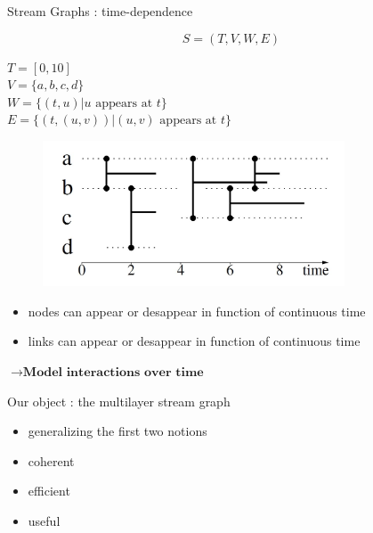 \documentclass[15pt]{beamer}
\begin{document}
\begin{frame}{Stream Graphs : time-dependence}

\[
	S=(T,V,W,E)
\]
\medskip

\begin{minipage}{0.43\textwidth}
\begin{footnotesize}
$T=[0,10]$\\
$V=\{a,b,c,d\}$\\
$W = \{(t,u) | u \text{ appears at } t\}$\\
$E = \{(t,(u,v)) | (u,v) \text{ appears at } t\}$
\end{footnotesize}
\end{minipage}
\begin{minipage}[r]{0.55\textwidth}
\begin{figure}
    \flushright
    \includegraphics[width=0.8\textwidth]{img/exampleStream.JPG}
    \label{fig:exstream}
\end{figure}
\end{minipage}
\medskip

\begin{itemize}
    \item nodes can appear or desappear in function of continuous time
    \item links can appear or desappear in function of continuous time
\end{itemize}
\smallskip
\centering
$\rightarrow \textbf{Model interactions over time}$





\end{frame}

\begin{frame}{Our object : the multilayer stream graph}
	\begin{itemize}
		\item generalizing the first two notions\pause
		\item coherent \pause
		\item efficient \pause
		\item useful
	\end{itemize}
\end{frame}
\end{document}
